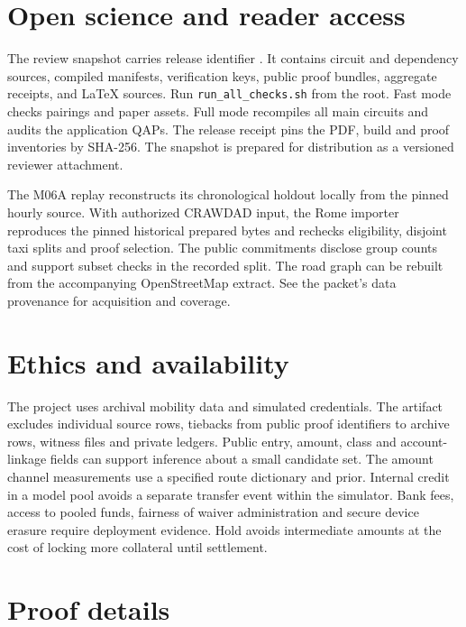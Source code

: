 \section{Open science and reader access}
\label{app:openscience}

The review snapshot carries release identifier \texttt{\ReleaseIdentifier}. It contains circuit and dependency sources, compiled manifests, verification keys, public proof bundles, aggregate receipts, and \LaTeX{} sources. Run \texttt{run\_all\_checks.sh} from the root. Fast mode checks pairings and paper assets. Full mode recompiles all main circuits and audits the application QAPs. The release receipt pins the PDF, build and proof inventories by SHA-256. The snapshot is prepared for distribution as a versioned reviewer attachment.

The M06A replay reconstructs its chronological holdout locally from the pinned hourly source. With authorized CRAWDAD input, the Rome importer reproduces the pinned historical prepared bytes and rechecks eligibility, disjoint taxi splits and proof selection. The public commitments disclose group counts and support subset checks in the recorded split. The road graph can be rebuilt from the accompanying OpenStreetMap extract. See the packet's data provenance for acquisition and coverage.

\section{Ethics and availability}
\label{app:ethics}
The project uses archival mobility data and simulated credentials. The artifact excludes individual source rows, tiebacks from public proof identifiers to archive rows, witness files and private ledgers. Public entry, amount, class and account-linkage fields can support inference about a small candidate set. The amount channel measurements use a specified route dictionary and prior. Internal credit in a model pool avoids a separate transfer event within the simulator. Bank fees, access to pooled funds, fairness of waiver administration and secure device erasure require deployment evidence. Hold avoids intermediate amounts at the cost of locking more collateral until settlement.

\section{Proof details}
\label{app:proofs}

